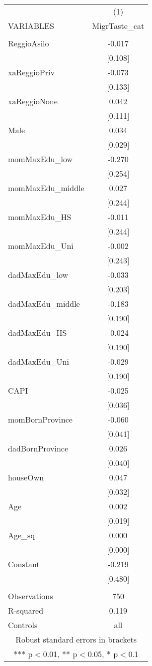 \documentclass[]{article}
\begin{document}
\begin{tabular}{lc} \hline
 & (1) \\
VARIABLES & MigrTaste\_cat \\ \hline
 &  \\
ReggioAsilo & -0.017 \\
 & [0.108] \\
xaReggioPriv & -0.073 \\
 & [0.133] \\
xaReggioNone & 0.042 \\
 & [0.111] \\
Male & 0.034 \\
 & [0.029] \\
momMaxEdu\_low & -0.270 \\
 & [0.254] \\
momMaxEdu\_middle & 0.027 \\
 & [0.244] \\
momMaxEdu\_HS & -0.011 \\
 & [0.244] \\
momMaxEdu\_Uni & -0.002 \\
 & [0.243] \\
dadMaxEdu\_low & -0.033 \\
 & [0.203] \\
dadMaxEdu\_middle & -0.183 \\
 & [0.190] \\
dadMaxEdu\_HS & -0.024 \\
 & [0.190] \\
dadMaxEdu\_Uni & -0.029 \\
 & [0.190] \\
CAPI & -0.025 \\
 & [0.036] \\
momBornProvince & -0.060 \\
 & [0.041] \\
dadBornProvince & 0.026 \\
 & [0.040] \\
houseOwn & 0.047 \\
 & [0.032] \\
Age & 0.002 \\
 & [0.019] \\
Age\_sq & 0.000 \\
 & [0.000] \\
Constant & -0.219 \\
 & [0.480] \\
 &  \\
Observations & 750 \\
R-squared & 0.119 \\
 Controls & all \\ \hline
\multicolumn{2}{c}{ Robust standard errors in brackets} \\
\multicolumn{2}{c}{ *** p$<$0.01, ** p$<$0.05, * p$<$0.1} \\
\end{tabular}
\end{document}
